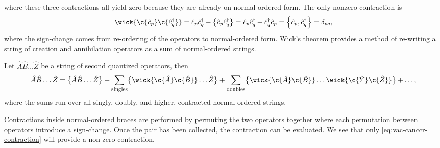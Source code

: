         where these three contractions all yield zero because they are already
        on normal-ordered form.
        The only-nonzero contraction is
        \begin{align}
            \wick{
                \c {\can{p}}
                \c {\ccr{q}}
            }
            = \can{p}\ccr{q}
            - \normalord{\can{p}\ccr{q}}
            = \can{p}\ccr{q}
            + \ccr{q}\can{p}
            = \acom{\can{p}}{\ccr{q}}
            = \delta_{pq},
            \label{eq:vac-canccr-contraction}
        \end{align}
        where the sign-change comes from re-ordering of the operators to
        normal-ordered form.
        Wick's theorem provides a method of re-writing a string of creation and
        annihilation operators as a sum of normal-ordered strings.
        \begin{theorem}
            \label{theorem:wick}
            Let $\hat{A}\hat{B}\dots\hat{Z}$ be a string of second quantized
            operators, then
            \begin{align}
                \hat{A}\hat{B}\dots\hat{Z}
                = \normalord{\hat{A}\hat{B}\dots\hat{Z}}
                + \sum_{\text{singles}} \normalord{
                    \wick{
                        \c {\hat{A}}
                        \c {\hat{B}}
                    }
                    \dots
                    \hat{Z}
                }
                + \sum_{\text{doubles}} \normalord{
                    \wick{
                        \c {\hat{A}}
                        \c {\hat{B}}
                    }
                    \dots
                    \wick{
                        \c {\hat{Y}}
                        \c {\hat{Z}}
                    }
                }
                + \dots,
            \end{align}
            where the sums run over all singly, doubly, and higher, contracted
            normal-ordered strings.
        \end{theorem}
        Contractions inside normal-ordered braces are performed by permuting
        the two operators together where each permutation between operators
        introduce a sign-change.
        Once the pair has been collected, the contraction can be evaluated.
        We see that only \autoref{eq:vac-canccr-contraction} will provide a
        non-zero contraction.

